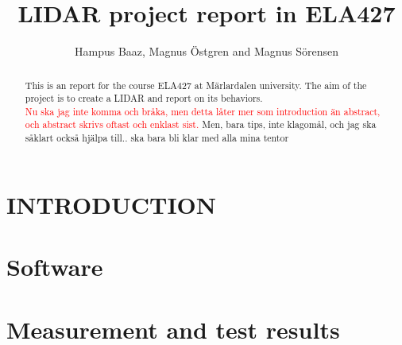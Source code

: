 

\title{\LARGE \bf
LIDAR project report in ELA427}
\author{Hampus Baaz, Magnus \"{O}stgren and Magnus S\"{o}rensen }


\maketitle
\thispagestyle{empty}
\pagestyle{empty}

\begin{abstract}
This is an report for the course ELA427 at M\"{a}rlardalen university. The aim of the project is to create a LIDAR and report on its behaviors.\\
\textcolor{red}{Nu ska jag inte komma och bråka, men detta låter mer som introduction än abstract, och abstract skrivs oftast och enklast sist.} Men, bara tips, inte klagomål, och jag ska såklart också hjälpa till.. ska bara bli klar med alla mina tentor 
\end{abstract}


\section{INTRODUCTION}






\section{Software}

\section{Measurement and test results}

\printbibliography
